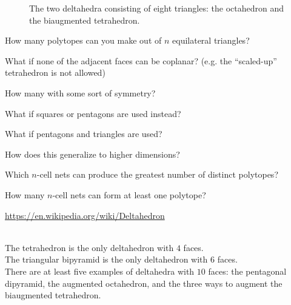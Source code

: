 \documentclass{article}
\begin{document}
\begin{figure}[ht!]
{  }
  \caption{The two deltahedra consisting of eight triangles: the octahedron and the biaugmented tetrahedron.}
\end{figure}

\begin{question}
  How many polytopes can you make out of $n$ equilateral triangles?
\end{question}

\begin{related}
  \item What if none of the adjacent faces can be coplanar?
    (e.g. the ``scaled-up'' tetrahedron is not allowed)
  \item How many with some sort of symmetry?
  \item What if squares or pentagons are used instead?
  \item What if pentagons and triangles are used?
  \item How does this generalize to higher dimensions?
  \item Which $n$-cell nets can produce the greatest number of distinct polytopes?
  \item How many $n$-cell nets can form at least one polytope?
\end{related}

\begin{references}
  \item \url{https://en.wikipedia.org/wiki/Deltahedron}
\end{references}

\begin{note} ~ \\
  The tetrahedron is the only deltahedron with $4$ faces.\\
  The triangular bipyramid is the only deltahedron with $6$ faces.\\
  There are at least five examples of deltahedra with $10$ faces:
  the pentagonal dipyramid,
  the augmented octahedron,
  and the three ways to augment the biaugmented tetrahedron.
\end{note}
\end{document}
